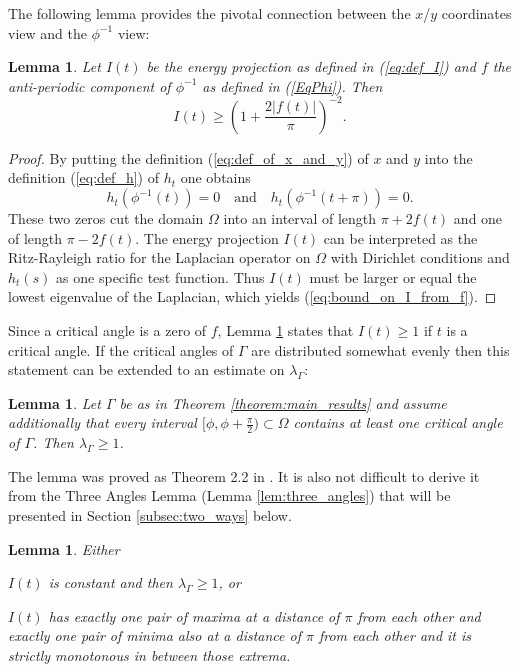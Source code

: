 \documentclass{article}
\newtheorem{lemma}[definition]{Lemma}
\begin{document}
The following lemma provides the pivotal connection between the $x$/$y$ coordinates view and the $\phi^{-1}$ view:
\begin{lemma} \label{lem:bound_on_I_from_f}
    Let $I(t)$ be the energy projection as defined in (\ref{eq:def_I}) and $f$ the anti-periodic component of $\phi^{-1}$ as defined in (\ref{EqPhi}). Then
    \begin{equation}\label{eq:bound_on_I_from_f}
        I(t) \ge \left(1+\frac{2 |f(t)|}{\pi}\right)^{-2}.
    \end{equation}
\end{lemma}
\begin{proof}
        By putting the definition (\ref{eq:def_of_x_and_y}) of $x$ and $y$ into the definition (\ref{eq:def_h}) of $h_t$ one obtains
        \[h_t(\phi^{-1}(t)) = 0 \quad \text{and}\quad h_t(\phi^{-1}(t+\pi)) = 0  .\]
        These two zeros cut the domain $\Omega$ into an interval of length $\pi+2f(t)$ and one of length $\pi-2f(t)$.
        The energy projection $I(t)$ can be interpreted as the Ritz-Rayleigh ratio for the Laplacian operator on $\Omega$ with Dirichlet conditions and $h_t(s)$ as one specific test function. Thus $I(t)$ must be larger or equal the lowest eigenvalue of the Laplacian, which yields (\ref{eq:bound_on_I_from_f}).
\end{proof}

Since a critical angle is a zero of $f$, Lemma \ref{lem:bound_on_I_from_f} states that $I(t) \ge 1$ if $t$ is a critical angle.
If the critical angles of $\Gamma$ are distributed somewhat evenly then this statement can be extended to an estimate on $\lambda_\Gamma$:

\begin{lemma} \label{lem:EvenlyDistributedCriticalAngles}
Let $\Gamma$ be as in Theorem \ref{theorem:main_results} and assume additionally that every interval $[\phi,\phi+\frac\pi 2)
\subset \Omega$ contains at least one critical angle of $\Gamma$. Then $\lambda_\Gamma \ge 1$.
\end{lemma}
The lemma was proved as Theorem 2.2 in \cite{Linde:ALowerBound}. It is also not difficult to derive it from the Three Angles Lemma (Lemma \ref{lem:three_angles}) that will be presented in Section \ref{subsec:two_ways} below. %

\begin{lemma} \label{lem:facts_about_I}
    Either 
    
    $I(t)$ is constant and then $\lambda_\Gamma\ge 1$, or 
    
    $I(t)$ has exactly one pair of maxima at a distance of $\pi$ from each other and exactly one pair of minima also at a distance of $\pi$ from each other and it is strictly monotonous in between those extrema.
\end{lemma}
\end{document}
